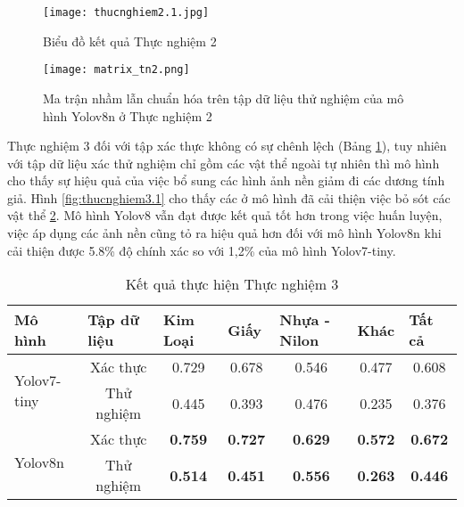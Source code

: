 \documentclass[../the.tex]{subfiles}
\begin{document}
\begin{figure}[H]
    \centering
    \texttt{[image: thucnghiem2.1.jpg]}
    \caption{Biểu đồ kết quả Thực nghiệm 2}
    \label{fig:thucnghiem2}
\end{figure}

\begin{figure}[H]
    \centering
    \texttt{[image: matrix\_tn2.png]}
    \caption{Ma trận nhầm lẫn chuẩn hóa trên tập dữ liệu thử nghiệm của mô hình Yolov8n ở Thực nghiệm 2}
    \label{fig:thucnghiem2.1}
\end{figure}

{\fontsize{13}{12} \selectfont
Thực nghiệm 3 đối với tập xác thực không có sự chênh lệch (Bảng \ref{tab:thucnghiem3.1}), tuy nhiên với tập dữ liệu xác thử nghiệm chỉ gồm các vật thể ngoài tự nhiên thì mô hình
cho thấy sự hiệu quả của việc bổ sung các hình ảnh nền giảm đi các dương tính giả. Hình \ref{fig:thucnghiem3.1} cho thấy các ở mô hình đã cải thiện việc bỏ sót các vật thể \ref{fig:thucnghiem2.1}.
Mô hình Yolov8 vẫn đạt được kết quả tốt hơn trong việc huấn luyện, việc áp dụng các ảnh nền cũng tỏ ra hiệu quả hơn đối với mô hình Yolov8n khi cải thiện được 5.8\% độ chính xác so với 1,2\% của mô hình Yolov7-tiny.
}

\begin{table}[h!]
    \centering
    \caption{Kết quả thực hiện Thực nghiệm 3}
    \begin{tabular}{|l|c|c|c|c|c|c|}
        \hline
        \textbf{Mô hình}             & \multicolumn{1}{l|}{\textbf{Tập dữ liệu}} & \multicolumn{1}{l|}{\textbf{Kim Loại}} & \multicolumn{1}{l|}{\textbf{Giấy}} & \multicolumn{1}{l|}{\textbf{Nhựa - Nilon}} & \multicolumn{1}{l|}{\textbf{Khác}} & \multicolumn{1}{l|}{\textbf{Tất cả}} \\ \hline
        \multirow{2}{*}{Yolov7-tiny} & Xác thực                                  & 0.729                                 & 0.678                              & 0.546                                      & 0.477                             & 0.608                                \\ \cline{2-7}
                                     & Thử nghiệm                                & 0.445                                   & 0.393                              & 0.476                                      & 0.235                              & 0.376                                \\ \hline
        \multirow{2}{*}{Yolov8n}     & Xác thực                                  & \textbf{0.759}                         & \textbf{0.727}                     & \textbf{0.629}                             & \textbf{0.572}                     & \textbf{0.672}                       \\ \cline{2-7}
                                     & Thử nghiệm                                & \textbf{0.514}                         & \textbf{0.451}                     & \textbf{0.556}                             & \textbf{0.263}                     & \textbf{0.446}                       \\ \hline
    \end{tabular}
    \label{tab:thucnghiem3.1}
\end{table}
\end{document}
